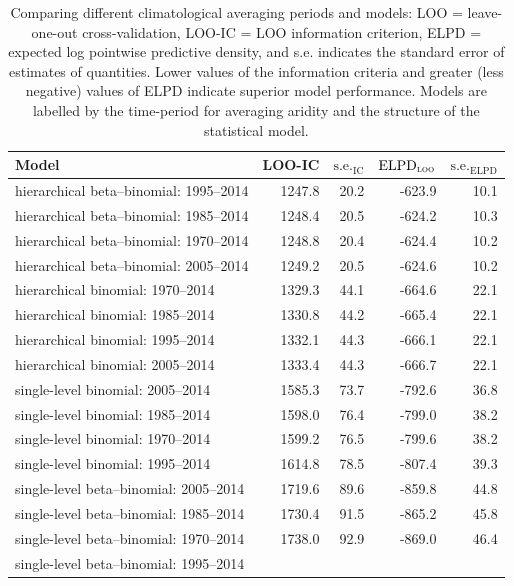 \documentclass[draft]{agujournal}\usepackage{knitr}
\begin{document}
\begin{table}[H]
\centering
\begingroup\small
\begin{tabular}{p{3in}rrrr}
  \hline
Model & LOO-IC & $\text{s.e.}_{\text{IC}}$ & $\text{ELPD}_{\text{\scshape{loo}}}$ & $\text{s.e.}_{\text{ELPD}}$ \\ 
  \hline
hierarchical beta--binomial: 1995--2014 & 1247.8 & 20.2 & -623.9 & 10.1 \\ 
  hierarchical beta--binomial: 1985--2014 & 1248.4 & 20.5 & -624.2 & 10.3 \\ 
  hierarchical beta--binomial: 1970--2014 & 1248.8 & 20.4 & -624.4 & 10.2 \\ 
  hierarchical beta--binomial: 2005--2014 & 1249.2 & 20.5 & -624.6 & 10.2 \\ 
  hierarchical binomial: 1970--2014 & 1329.3 & 44.1 & -664.6 & 22.1 \\ 
  hierarchical binomial: 1985--2014 & 1330.8 & 44.2 & -665.4 & 22.1 \\ 
  hierarchical binomial: 1995--2014 & 1332.1 & 44.3 & -666.1 & 22.1 \\ 
  hierarchical binomial: 2005--2014 & 1333.4 & 44.3 & -666.7 & 22.1 \\ 
  single-level binomial: 2005--2014 & 1585.3 & 73.7 & -792.6 & 36.8 \\ 
  single-level binomial: 1985--2014 & 1598.0 & 76.4 & -799.0 & 38.2 \\ 
  single-level binomial: 1970--2014 & 1599.2 & 76.5 & -799.6 & 38.2 \\ 
  single-level binomial: 1995--2014 & 1614.8 & 78.5 & -807.4 & 39.3 \\ 
  single-level beta--binomial: 2005--2014 & 1719.6 & 89.6 & -859.8 & 44.8 \\ 
  single-level beta--binomial: 1985--2014 & 1730.4 & 91.5 & -865.2 & 45.8 \\ 
  single-level beta--binomial: 1970--2014 & 1738.0 & 92.9 & -869.0 & 46.4 \\ 
  single-level beta--binomial: 1995--2014 &  &  &  &  \\ 
   \hline
\end{tabular}
\endgroup
\caption[Model comparison: LOO (climatological interval).]{Comparing different climatological averaging periods and models: LOO = leave-one-out cross-validation, LOO-IC = LOO information criterion, ELPD = expected log pointwise predictive density, and s.e. indicates the standard error of estimates of quantities. Lower values of the information criteria and greater (less negative) values of ELPD indicate superior model performance. Models are labelled by the time-period for averaging aridity and the structure of the statistical model.} 
\label{tab:loo.years}
\end{table}
\end{document}
